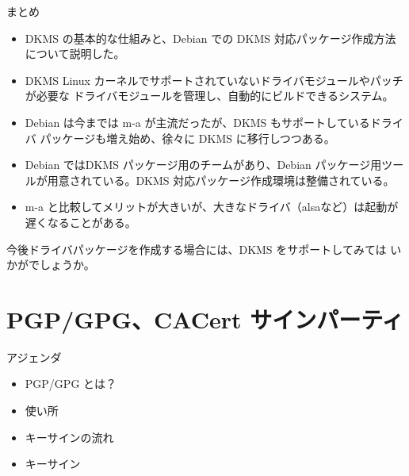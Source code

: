 \begin{frame}[containsverbatim]{まとめ}

\begin{itemize}

\item  DKMS の基本的な仕組みと、Debian での DKMS 対応パッケージ作成方法
について説明した。
\item DKMS Linux カーネルでサポートされていないドライバモジュールやパッチが必要な
ドライバモジュールを管理し、自動的にビルドできるシステム。
\item Debian は今までは m-a が主流だったが、DKMS もサポートしているドライバ
パッケージも増え始め、徐々に DKMS に移行しつつある。
\item Debian ではDKMS パッケージ用のチームがあり、Debian パッケージ用ツールが用意されている。DKMS 対応パッケージ作成環境は整備されている。
\item m-a と比較してメリットが大きいが、大きなドライバ（alsaなど）は起動が
遅くなることがある。
\end{itemize}

今後ドライバパッケージを作成する場合には、DKMS をサポートしてみては
いかがでしょうか。

\end{frame}



\section{PGP/GPG、CACert サインパーティ}

\begin{frame}{アジェンダ}
\begin{itemize}
\item PGP/GPG とは？
\item 使い所
\item キーサインの流れ
\item キーサイン
\end{itemize}
\end{frame}

